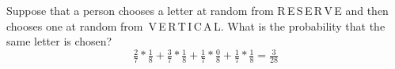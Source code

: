 \item Suppose that a person chooses a letter at random from R\,E\,S\,E\,R\,V\,E and then chooses one at random from \,V\,E\,R\,T\,I\,C\,A\,L. What is the probability that the same letter is chosen?
\[ 
\tfrac{2}{7} * \tfrac{1}{8} + \tfrac{3}{7} * \tfrac{1}{8} +
\tfrac{1}{7} * \tfrac{0}{8} + \tfrac{1}{7} * \tfrac{1}{8} = \tfrac{3}{28}  \]